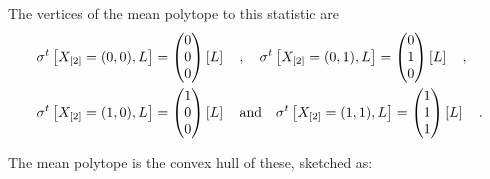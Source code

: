 \begin{example}
    The vertices of the mean polytope to this statistic are
    \begin{align*}
        &\sigma^{t}\left[X_{[2]}=(0,0),L\right] =
        \begin{pmatrix} 0 \\ 0 \\ 0 \end{pmatrix}\left[L\right]
        \quad , \quad
        \sigma^{t}\left[X_{[2]}=(0,1),L\right] =
        \begin{pmatrix} 0 \\ 1 \\ 0 \end{pmatrix}\left[L\right]
        \quad , \quad \\
        &\sigma^{t}\left[X_{[2]}=(1,0),L\right] =
        \begin{pmatrix} 1 \\ 0 \\ 0 \end{pmatrix}\left[L\right]
        \quad \text{and} \quad
        \sigma^{t}\left[X_{[2]}=(1,1),L\right] =
        \begin{pmatrix} 1 \\ 1 \\ 1 \end{pmatrix}\left[L\right]
        \quad .
    \end{align*}

    The mean polytope is the convex hull of these, sketched as:
    \begin{center}


\end{center}
\end{example}
